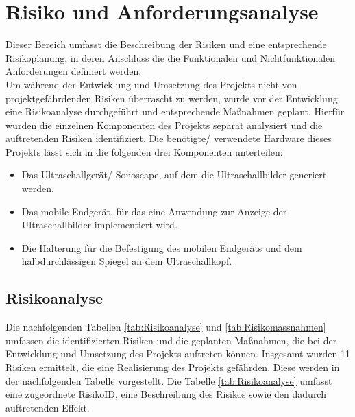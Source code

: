 \chapter{Risiko und Anforderungsanalyse}
Dieser Bereich umfasst die Beschreibung der Risiken und eine entsprechende Risikoplanung, in deren Anschluss die die Funktionalen und Nichtfunktionalen Anforderungen definiert werden.\\
Um während der Entwicklung und Umsetzung des Projekts nicht von projektgefährdenden Risiken überrascht zu werden, wurde vor der Entwicklung eine Risikoanalyse durchgeführt und entsprechende Maßnahmen geplant. Hierfür wurden die einzelnen Komponenten des Projekts separat analysiert und die auftretenden Risiken identifiziert. Die benötigte/ verwendete Hardware dieses Projekts lässt sich in die folgenden drei Komponenten unterteilen:
\\
\begin{minipage}{\textwidth}
\begin{itemize}
\item Das Ultraschallgerät/ Sonoscape, auf dem die Ultraschallbilder generiert werden.
\item Das mobile Endgerät, für das eine Anwendung zur Anzeige der Ultraschallbilder implementiert wird.
\item Die Halterung für die Befestigung des mobilen Endgeräts und dem halbdurchlässigen Spiegel an dem Ultraschallkopf.
\end{itemize}
\end{minipage}

\section{Risikoanalyse} \label{RisikoAnalyse}
Die nachfolgenden Tabellen \ref{tab:Risikoanalyse} und \ref{tab:Risikomassnahmen} umfassen die identifizierten Risiken und die geplanten Maßnahmen, die bei der Entwicklung und Umsetzung des Projekts auftreten können. Insgesamt wurden 11 Risiken ermittelt, die eine Realisierung des Projekts gefährden. Diese werden in der nachfolgenden Tabelle vorgestellt. Die Tabelle \ref{tab:Risikoanalyse} umfasst eine zugeordnete RisikoID, eine Beschreibung des Risikos sowie den dadurch auftretenden Effekt.

